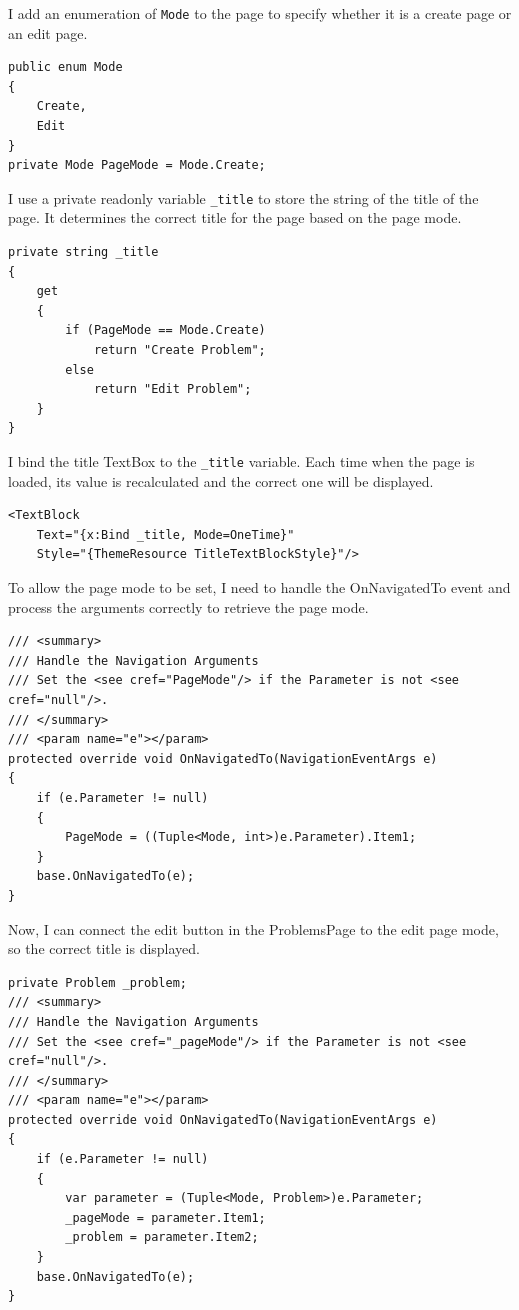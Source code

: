 \documentclass[a4paper]{report}
\begin{document}
I add an enumeration of \verb|Mode| to the page to specify whether it is a create page or an edit page.

\begin{verbatim}
public enum Mode
{
    Create,
    Edit
}
private Mode PageMode = Mode.Create;
\end{verbatim}

I use a private readonly variable \verb|_title| to store the string of the title of the page. It determines the correct title for the page based on the page mode.

\begin{verbatim}
private string _title
{
    get
    {
        if (PageMode == Mode.Create)
            return "Create Problem";
        else
            return "Edit Problem";
    }
}
\end{verbatim}

I bind the title TextBox to the \verb|_title| variable. Each time when the page is loaded, its value is recalculated and the correct one will be displayed.

\begin{verbatim}
<TextBlock
    Text="{x:Bind _title, Mode=OneTime}"
    Style="{ThemeResource TitleTextBlockStyle}"/>
\end{verbatim}

To allow the page mode to be set, I need to handle the OnNavigatedTo event and process the arguments correctly to retrieve the page mode.

\begin{verbatim}
/// <summary>
/// Handle the Navigation Arguments
/// Set the <see cref="PageMode"/> if the Parameter is not <see cref="null"/>.
/// </summary>
/// <param name="e"></param>
protected override void OnNavigatedTo(NavigationEventArgs e)
{
    if (e.Parameter != null)
    {
        PageMode = ((Tuple<Mode, int>)e.Parameter).Item1;
    }
    base.OnNavigatedTo(e);
}
\end{verbatim}

Now, I can connect the edit button in the ProblemsPage to the edit page mode, so the correct title is displayed.

\begin{verbatim}
private Problem _problem;
/// <summary>
/// Handle the Navigation Arguments
/// Set the <see cref="_pageMode"/> if the Parameter is not <see cref="null"/>.
/// </summary>
/// <param name="e"></param>
protected override void OnNavigatedTo(NavigationEventArgs e)
{
    if (e.Parameter != null)
    {
        var parameter = (Tuple<Mode, Problem>)e.Parameter;
        _pageMode = parameter.Item1;
        _problem = parameter.Item2;
    }
    base.OnNavigatedTo(e);
}
\end{verbatim}
\end{document}
